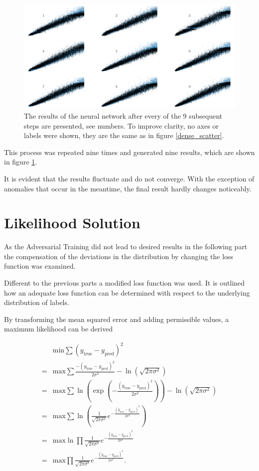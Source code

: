 \documentclass[12pt, a4paper]{thesis}
\begin{document}
\begin{figure}[H]
\centering
\includegraphics[width=.9\linewidth]{../images/adv_scatter.png}
\caption{ The results of the neural network after every of the 9
  subsequent steps are presented, see numbers. To improve clarity, no
  axes or labels were shown, they are the same as in figure
  \ref{dense_scatter}.}
\label{adv_scatter}
\end{figure}

This process was repeated nine times and generated nine results, which
are shown in figure \ref{adv_scatter}.

It is evident that the results fluctuate and do not converge. With
the exception of anomalies that occur in the meantime, the final
result hardly changes noticeably.

\section{Likelihood Solution}
\label{sec:org05c2ceb}

As the Adversarial Training did not lead to desired results in the
following part the compensation of the deviations in the distribution
by changing the loss function was examined.

Different to the previous parts a modified loss function was used. It
is outlined how an adequate loss function can be determined with
respect to the underlying distribution of labels.

By transforming the mean squared error and adding permissible values,
a maximum likelihood can be derived

\begin{align}
    &\text{min} \sum (y_{\text{true}}-y_{\text{pred}})^2
  \\ =&\text{max} \sum\frac{-(y_{\text{true}}-y_{\text{pred}})^2}{2
    \sigma^2} - \ln(\sqrt{2\pi \sigma^2}) \\ = &\text{max} \sum
  \ln(\exp(-\frac{(y_{\text{true}}-y_{\text{pred}})^2}{2 \sigma^2})) -
  \ln(\sqrt{2\pi \sigma^2}) \\ = &\text{max} \sum \ln(
  \frac{1}{\sqrt{2\pi \sigma^2}}
  e^{-\frac{(y_{\text{true}}-y_{\text{pred}})^2}{2 \sigma^2}}) \\ =
  &\text{max} \ln \prod \frac{1}{\sqrt{2\pi \sigma^2}}
  e^{-\frac{(y_{\text{true}}-y_{\text{pred}})^2}{2 \sigma^2}}\\ =
  &\text{max} \prod \frac{1}{\sqrt{2\pi \sigma^2}}
  e^{-\frac{(y_{\text{true}}-y_{\text{pred}})^2}{2 \sigma^2}}.
\end{align}
\end{document}
